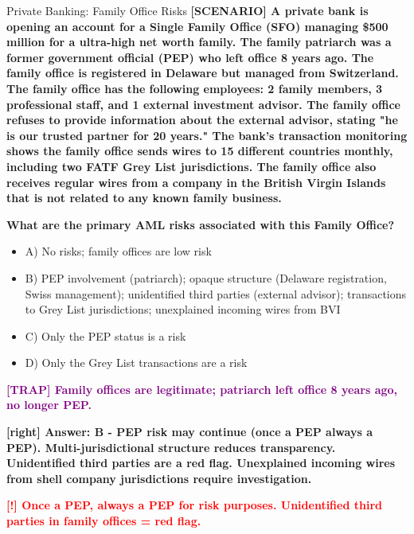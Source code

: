 \documentclass[11pt,a4paper]{beamer}
\newcommand{\redflag}[1]{\textcolor{red}{\textbf{[!] #1}}}
\newcommand{\trap}[1]{\textcolor{purple}{\textbf{[TRAP] #1}}}
\newcommand{\correct}[1]{\textcolor{green!50!black}{\textbf{[right] #1}}}
\newcommand{\scenario}[1]{\textcolor{blue!70!black}{\textbf{[SCENARIO] #1}}}
\begin{document}
	
	\begin{frame}{Private Banking: Family Office Risks}
		\tiny
		\scenario{A private bank is opening an account for a Single Family Office (SFO) managing \$500 million for a ultra-high net worth family. The family patriarch was a former government official (PEP) who left office 8 years ago. The family office is registered in Delaware but managed from Switzerland. The family office has the following employees: 2 family members, 3 professional staff, and 1 external investment advisor. The family office refuses to provide information about the external advisor, stating "he is our trusted partner for 20 years." The bank's transaction monitoring shows the family office sends wires to 15 different countries monthly, including two FATF Grey List jurisdictions. The family office also receives regular wires from a company in the British Virgin Islands that is not related to any known family business.}
		
		\vspace{0.02cm}
		\textbf{What are the primary AML risks associated with this Family Office?}
		\vspace{0.02cm}
		
		\begin{itemize}
			\item A) No risks; family offices are low risk
			\item B) PEP involvement (patriarch); opaque structure (Delaware registration, Swiss management); unidentified third parties (external advisor); transactions to Grey List jurisdictions; unexplained incoming wires from BVI
			\item C) Only the PEP status is a risk
			\item D) Only the Grey List transactions are a risk
		\end{itemize}
		
		\vspace{0.02cm}
		\trap{Family offices are legitimate; patriarch left office 8 years ago, no longer PEP.}
		
		\vspace{0.02cm}
		\correct{Answer: B - PEP risk may continue (once a PEP always a PEP). Multi-jurisdictional structure reduces transparency. Unidentified third parties are a red flag. Unexplained incoming wires from shell company jurisdictions require investigation.}
		
		\vspace{0.02cm}
		\redflag{Once a PEP, always a PEP for risk purposes. Unidentified third parties in family offices = red flag.}
	\end{frame}
	
\end{document}
